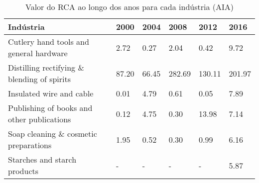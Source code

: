 \begin{table}
\centering
\caption{Valor do RCA ao longo dos anos para cada indústria (AIA)}
\label{tab:ex3-tempo-AIA}
\begin{tabular}{p{6cm}p{1.5cm}p{1.5cm}p{1.5cm}p{1.5cm}p{1.5cm}}
\toprule
                                  Indústria &  2000 &  2004 &   2008 &   2012 &   2016 \\
\midrule
    Cutlery hand tools and general hardware &  2.72 &  0.27 &   2.04 &   0.42 &   9.72 \\
Distilling rectifying \& blending of spirits & 87.20 & 66.45 & 282.69 & 130.11 & 201.97 \\
                   Insulated wire and cable &  0.01 &  4.79 &   0.61 &   0.05 &   7.89 \\
 Publishing of books and other publications &  0.12 &  4.75 &   0.30 &  13.98 &   7.14 \\
      Soap cleaning \& cosmetic preparations &  1.95 &  0.52 &   0.30 &   0.99 &   6.16 \\
               Starches and starch products &     - &     - &      - &      - &   5.87 \\
\bottomrule
\end{tabular}
\end{table}
